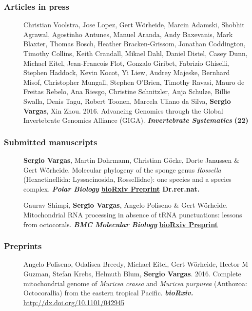 \documentclass[letter,10pt]{article}
\begin{document}
\subsubsection*{Articles in press}
\begin{description}

\item[] Christian Voolstra, Jose Lopez, Gert W\"orheide, Marcin Adamski, Shobhit Agrawal, Agostinho Antunes, Manuel Aranda, Andy Baxevanis, Mark Blaxter, Thomas Bosch, Heather Bracken-Grissom, Jonathan Coddington, Timothy Collins, Keith Crandall, Mikael Dahl, Daniel Distel, Casey Dunn, Michael Eitel, Jean-Francois Flot, Gonzalo Giribet, Fabrizio Ghiselli, Stephen Haddock, Kevin Kocot, Yi Liew, Audrey Majeske, Bernhard Misof, Christopher Mungall, Stephen O'Brien, Timothy Ravasi, Mauro de Freitas Rebelo, Ana Riesgo, Christine Schnitzler, Anja Schulze, Billie Swalla, Denis Tagu, Robert Toonen, Marcela Uliano da Silva, \textbf{Sergio Vargas}, Xin Zhou. 2016. Advancing Genomics through the Global Invertebrate Genomics Alliance (GIGA). \textbf{\emph{Invertebrate Systematics}} \hfill\textbf{{\scriptsize (22)}}

\end{description}

\subsubsection*{Submitted manuscripts}
\begin{description}
	\item[]\textbf{Sergio Vargas}, Martin Dohrmann, Christian G\"ocke, Dorte Janussen \& Gert W\"orheide. Molecular phylogeny of the sponge genus \emph{Rossella} (Hexactinellida: Lyssacinosida, Rossellidae): one species and a species complex. \textbf{\emph{Polar Biology}} \hfill\textbf{{\scriptsize \href{http://dx.doi.org/10.1101/037440}{bioRxiv Preprint} Dr.rer.nat.}}
  
  \item[]Gaurav Shimpi, \textbf{Sergio Vargas}, Angelo Poliseno \& Gert W\"orheide. Mitochondrial RNA processing in absence of tRNA punctuations: lessons from octocorals. \textbf{\emph{BMC Molecular Biology}} \hfill\textbf{{\scriptsize\href{link}{bioRxiv Preprint}}}
\end{description}

\subsubsection*{Preprints}
\begin{description}
  \item[]Angelo Poliseno, Odalisca Breedy, Michael Eitel, Gert W\"orheide, Hector M Guzman, Stefan Krebs, Helmuth Blum, \textbf{Sergio Vargas}. 2016. Complete mitochondrial genome of \emph{Muricea crassa} and \emph{Muricea purpurea} (Anthozoa: Octocorallia) from the eastern tropical Pacific. \textbf{\emph{bioRxiv.}} \href{http://dx.doi.org/10.1101/042945}{http://dx.doi.org/10.1101/042945}
\end{description}
\end{document}
